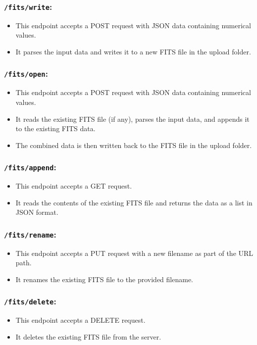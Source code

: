 \documentclass[a4paper,oneside,11pt]{book}
\begin{document}
\subsubsection{\texttt{/fits/write}:}
\begin{itemize}
    \item This endpoint accepts a POST request with JSON data containing numerical values.
    \item It parses the input data and writes it to a new FITS file in the upload folder.
\end{itemize}
\subsubsection{\texttt{/fits/open}:}
\begin{itemize}
    \item This endpoint accepts a POST request with JSON data containing numerical values.
    \item It reads the existing FITS file (if any), parses the input data, and appends it to the existing FITS data.
    \item The combined data is then written back to the FITS file in the upload folder.
\end{itemize}
\subsubsection{\texttt{/fits/append}:}
\begin{itemize}
    \item This endpoint accepts a GET request.
    \item It reads the contents of the existing FITS file and returns the data as a list in JSON format.
\end{itemize}
\subsubsection{\texttt{/fits/rename}:}
\begin{itemize}
    \item This endpoint accepts a PUT request with a new filename as part of the URL path.
    \item It renames the existing FITS file to the provided filename.
\end{itemize}
\subsubsection{\texttt{/fits/delete}:}
\begin{itemize}
    \item This endpoint accepts a DELETE request.
    \item It deletes the existing FITS file from the server.
\end{itemize}
\end{document}
